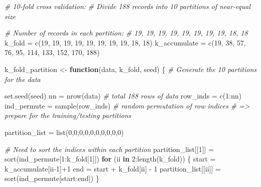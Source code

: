 \documentclass[
]{article}
\newenvironment{Shaded}{\begin{snugshade}}{\end{snugshade}}
\newcommand{\CommentTok}[1]{\textcolor[rgb]{0.56,0.35,0.01}{\textit{#1}}}
\newcommand{\ControlFlowTok}[1]{\textcolor[rgb]{0.13,0.29,0.53}{\textbf{#1}}}
\newcommand{\DecValTok}[1]{\textcolor[rgb]{0.00,0.00,0.81}{#1}}
\newcommand{\FunctionTok}[1]{\textcolor[rgb]{0.00,0.00,0.00}{#1}}
\newcommand{\NormalTok}[1]{#1}
\newcommand{\OtherTok}[1]{\textcolor[rgb]{0.56,0.35,0.01}{#1}}
\newcommand{\SpecialCharTok}[1]{\textcolor[rgb]{0.00,0.00,0.00}{#1}}
\begin{document}
\begin{Shaded}
\begin{Highlighting}[]
\CommentTok{\# 10{-}fold cross validation: }
\CommentTok{\# Divide 188 records into 10 partitions of near{-}equal size}

\CommentTok{\# Number of records in each partition:}
\CommentTok{\# 19, 19, 19, 19, 19, 19, 19, 19, 18, 18}
\NormalTok{k\_fold }\OtherTok{=} \FunctionTok{c}\NormalTok{(}\DecValTok{19}\NormalTok{, }\DecValTok{19}\NormalTok{, }\DecValTok{19}\NormalTok{, }\DecValTok{19}\NormalTok{, }\DecValTok{19}\NormalTok{, }\DecValTok{19}\NormalTok{, }\DecValTok{19}\NormalTok{, }\DecValTok{19}\NormalTok{, }\DecValTok{18}\NormalTok{, }\DecValTok{18}\NormalTok{)}
\NormalTok{k\_accumulate }\OtherTok{=} \FunctionTok{c}\NormalTok{(}\DecValTok{19}\NormalTok{, }\DecValTok{38}\NormalTok{, }\DecValTok{57}\NormalTok{, }\DecValTok{76}\NormalTok{, }\DecValTok{95}\NormalTok{, }\DecValTok{114}\NormalTok{, }\DecValTok{133}\NormalTok{, }\DecValTok{152}\NormalTok{, }\DecValTok{170}\NormalTok{, }\DecValTok{188}\NormalTok{)}

\NormalTok{k\_fold\_partition }\OtherTok{\textless{}{-}} \ControlFlowTok{function}\NormalTok{(data, k\_fold, seed) \{}
  \CommentTok{\# Generate the 10 partitions for the data}
  
  \FunctionTok{set.seed}\NormalTok{(seed) }
\NormalTok{  nn }\OtherTok{=} \FunctionTok{nrow}\NormalTok{(data) }\CommentTok{\# total 188 rows of data}
\NormalTok{  row\_inds }\OtherTok{=} \FunctionTok{c}\NormalTok{(}\DecValTok{1}\SpecialCharTok{:}\NormalTok{nn)}
\NormalTok{  ind\_permute }\OtherTok{=} \FunctionTok{sample}\NormalTok{(row\_inds) }
  \CommentTok{\# random permutation of row indices }
  \CommentTok{\# =\textgreater{} prepare for the training/testing partitions}
  
\NormalTok{  partition\_list }\OtherTok{=} \FunctionTok{list}\NormalTok{(}\DecValTok{0}\NormalTok{,}\DecValTok{0}\NormalTok{,}\DecValTok{0}\NormalTok{,}\DecValTok{0}\NormalTok{,}\DecValTok{0}\NormalTok{,}\DecValTok{0}\NormalTok{,}\DecValTok{0}\NormalTok{,}\DecValTok{0}\NormalTok{,}\DecValTok{0}\NormalTok{,}\DecValTok{0}\NormalTok{)}
  
  \CommentTok{\# Need to sort the indices within each partition}
\NormalTok{  partition\_list[[}\DecValTok{1}\NormalTok{]] }\OtherTok{=} \FunctionTok{sort}\NormalTok{(ind\_permute[}\DecValTok{1}\SpecialCharTok{:}\NormalTok{k\_fold[}\DecValTok{1}\NormalTok{]])}
  \ControlFlowTok{for}\NormalTok{ (ii }\ControlFlowTok{in} \DecValTok{2}\SpecialCharTok{:}\FunctionTok{length}\NormalTok{(k\_fold)) \{}
\NormalTok{    start }\OtherTok{=}\NormalTok{ k\_accumulate[ii}\DecValTok{{-}1}\NormalTok{]}\SpecialCharTok{+}\DecValTok{1}
\NormalTok{    end }\OtherTok{=}\NormalTok{ start }\SpecialCharTok{+}\NormalTok{ k\_fold[ii] }\SpecialCharTok{{-}} \DecValTok{1}
\NormalTok{    partition\_list[[ii]] }\OtherTok{=} \FunctionTok{sort}\NormalTok{(ind\_permute[start}\SpecialCharTok{:}\NormalTok{end])}
\NormalTok{  \}}
  

\end{Highlighting}
\end{Shaded}
\end{document}
